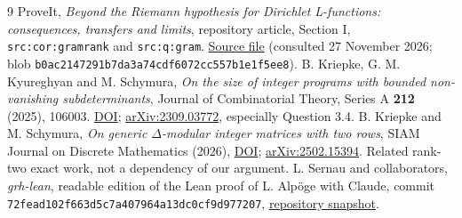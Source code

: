 \documentclass[11pt]{article}
\theoremstyle{remark}\newtheorem{remark}[theorem]{Remark}
\begin{document}
\begin{thebibliography}{9}
 ProveIt, \emph{Beyond the Riemann hypothesis for Dirichlet L-functions: consequences, transfers and limits}, repository article, Section I, \texttt{src:cor:gramrank} and \texttt{src:q:gram}. \href{https://github.com/VladimirReshetnikov/ProveIt/blob/main/Analysis/GeneralizedRiemannHypothesis/Article/sections/src.tex}{Source file} (consulted 27 November 2026; blob \texttt{b0ac2147291b7da3a74cdf6072cc557b1e1f5ee8}).
 B. Kriepke, G. M. Kyureghyan and M. Schymura, \emph{On the size of integer programs with bounded non-vanishing subdeterminants}, Journal of Combinatorial Theory, Series A \textbf{212} (2025), 106003. \href{https://doi.org/10.1016/j.jcta.2024.106003}{DOI}; \href{https://arxiv.org/abs/2309.03772}{arXiv:2309.03772}, especially Question 3.4.
 B. Kriepke and M. Schymura, \emph{On generic $\Delta$-modular integer matrices with two rows}, SIAM Journal on Discrete Mathematics (2026), \href{https://doi.org/10.1137/25M1745878}{DOI}; \href{https://arxiv.org/abs/2502.15394}{arXiv:2502.15394}. Related rank-two exact work, not a dependency of our argument.
 L. Sernau and collaborators, \emph{grh-lean}, readable edition of the Lean proof of L. Alp\"oge with Claude, commit \texttt{72fead102f663d5c7a407964a13dc0cf9d977207}, \href{https://github.com/lsernau/grh-lean/tree/72fead102f663d5c7a407964a13dc0cf9d977207/grh}{repository snapshot}.
\end{thebibliography}
\end{document}
